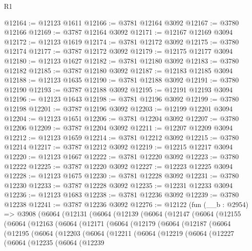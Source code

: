 \begin{lexlean}{R1}
\begin{coremodule}
@12164 := @12123 @1611
@12166 := @3781 @12164 @3092
@12167 := @3780 @12166
@12169 := @3787 @12164 @3092
@12171 := @12167 @12169 @3094
@12172 := @12123 @1619
@12174 := @3781 @12172 @3092
@12175 := @3780 @12174
@12177 := @3787 @12172 @3092
@12179 := @12175 @12177 @3094
@12180 := @12123 @1627
@12182 := @3781 @12180 @3092
@12183 := @3780 @12182
@12185 := @3787 @12180 @3092
@12187 := @12183 @12185 @3094
@12188 := @12123 @1635
@12190 := @3781 @12188 @3092
@12191 := @3780 @12190
@12193 := @3787 @12188 @3092
@12195 := @12191 @12193 @3094
@12196 := @12123 @1643
@12198 := @3781 @12196 @3092
@12199 := @3780 @12198
@12201 := @3787 @12196 @3092
@12203 := @12199 @12201 @3094
@12204 := @12123 @1651
@12206 := @3781 @12204 @3092
@12207 := @3780 @12206
@12209 := @3787 @12204 @3092
@12211 := @12207 @12209 @3094
@12212 := @12123 @1659
@12214 := @3781 @12212 @3092
@12215 := @3780 @12214
@12217 := @3787 @12212 @3092
@12219 := @12215 @12217 @3094
@12220 := @12123 @1667
@12222 := @3781 @12220 @3092
@12223 := @3780 @12222
@12225 := @3787 @12220 @3092
@12227 := @12223 @12225 @3094
@12228 := @12123 @1675
@12230 := @3781 @12228 @3092
@12231 := @3780 @12230
@12233 := @3787 @12228 @3092
@12235 := @12231 @12233 @3094
@12236 := @12123 @1683
@12238 := @3781 @12236 @3092
@12239 := @3780 @12238
@12241 := @3787 @12236 @3092
@12276 := @12122
    (fun (__b : @2954) =>
    @3908
      (@6064
        (@12131
          (@6064
            (@12139
              (@6064
                (@12147
                  (@6064
                    (@12155
                      (@6064
                        (@12163
                          (@6064
                            (@12171
                              (@6064
                                (@12179
                                  (@6064
                                    (@12187
                                      (@6064
                                        (@12195
                                          (@6064
                                            (@12203
                                              (@6064
                                                (@12211
                                                  (@6064
                                                    (@12219
                                                      (@6064
                                                        (@12227
                                                          (@6064
                                                            (@12235
                                                              (@6064
                                                                (@12239

\end{coremodule}
\end{lexlean}
